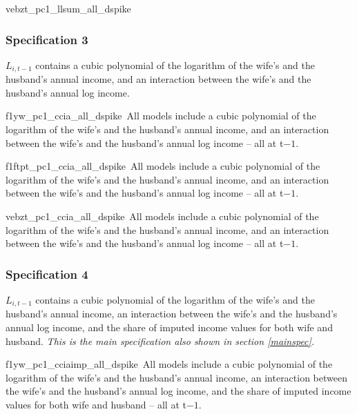 \documentclass[a4paper,11pt]{scrartcl}
\begin{document}
\begin{appendix}
		{vebzt_pc1_llsum_all_dspike}%
		{\samplenote\,\specnote}


		\subsubsection{Specification 3}

		$L_{i,t-1}$ contains a cubic polynomial of the logarithm of the wife's and the husband's annual income, and an interaction between the wife's and the husband's annual log income.

		\renewcommand{\specnote}{All models include a cubic polynomial of the logarithm of the wife's and the husband's annual income, and an interaction between the wife's and the husband's annual log income -- all at t$-1$.}

		{f1yw_pc1_ccia_all_dspike}%
		{\samplenote\,\specnote}

		{f1ftpt_pc1_ccia_all_dspike}%
		{\samplenote\,\specnote}

		{vebzt_pc1_ccia_all_dspike}%
		{\samplenote\,\specnote}


		\subsubsection{Specification 4}

		$L_{i,t-1}$ contains a cubic polynomial of the logarithm of the wife's and the husband's annual income, an interaction between the wife's and the husband's annual log income, and the share of imputed income values for both wife and husband.
		\textit{This is the main specification also shown in section \ref{mainspec}.}

		\renewcommand{\specnote}{All models include a cubic polynomial of the logarithm of the wife's and the husband's annual income, an interaction between the wife's and the husband's annual log income, and the share of imputed income values for both wife and husband -- all at t$-1$.}

		{f1yw_pc1_cciaimp_all_dspike}%
		{\samplenote\,\specnote}


\end{appendix}
\end{document}
